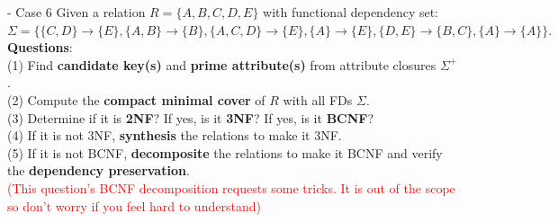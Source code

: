 \begin{frame}[fragile]{ - Case 6}
	Given a relation $R=\{A, B, C, D, E\}$ with functional dependency set:\\ 
	$\Sigma=\{\{C,D\} \rightarrow \{E\},\{A,B\} \rightarrow \{B\}, \{A,C,D\} \rightarrow \{E\},\{A\} \rightarrow \{E\},\{D,E\} \rightarrow \{B,C\},\{A\} \rightarrow \{A\}\}.$\\\vspace{10pt}
	\textbf{Questions}:\\
	(1) Find \textbf{candidate key(s)} and \textbf{prime attribute(s)} from attribute closures $\Sigma^{+}$.\\
	(2) Compute the \textbf{compact minimal cover} of $R$ with all FDs $\Sigma$.\\
	(3) Determine if it is \textbf{2NF}? If yes, is it \textbf{3NF}? If yes, is it \textbf{BCNF}?\\
	(4) If it is not 3NF, \textbf{synthesis} the relations to make it 3NF.\\
	(5) If it is not BCNF, \textbf{decomposite} the relations to make it BCNF and verify the \textbf{dependency preservation}. 
	\\
	\textcolor{red}{(This question's BCNF decomposition requests some tricks. It is out of the scope so don't worry if you feel hard to understand)}
\end{frame}

